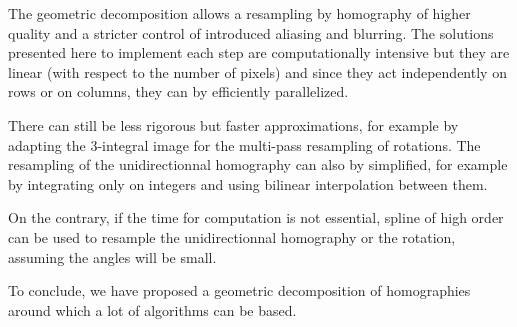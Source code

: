 









The geometric decomposition allows a resampling by homography of higher quality and a stricter control of introduced aliasing and blurring. The solutions presented here to implement each step are computationally intensive but they are linear (with respect to the number of pixels) and since they act independently on rows or on columns, they can by efficiently parallelized.

There can still be less rigorous but faster approximations, for example by adapting the 3-integral image for the multi-pass resampling of rotations. The resampling of the unidirectionnal homography can also by simplified, for example by integrating only on integers and using bilinear interpolation between them.

On the contrary, if the time for computation is not essential, spline of high order can be used to resample the unidirectionnal homography or the rotation, assuming the angles will be small.

To conclude, we have proposed a geometric decomposition of homographies around which a lot of algorithms can be based.
